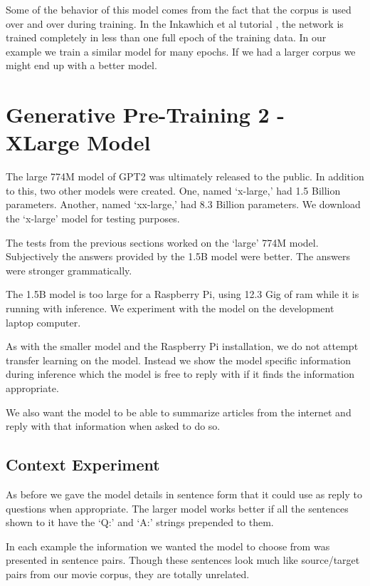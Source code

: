 Some of the behavior of this model comes from the fact that the corpus is used over and over during training. In the Inkawhich et al tutorial \cite{2018Inkawhich}, the network is trained completely in less than one full epoch of the training data. In our example we train a similar model for many epochs. If we had a larger corpus we might end up with a better model.



\section{Generative Pre-Training 2 - XLarge Model}

The large 774M model of GPT2 was ultimately released to the public. In addition to this, two other models were created. One, named `x-large,' had 1.5 Billion parameters. Another, named `xx-large,' had 8.3 Billion parameters. We download the `x-large' model for testing purposes.

The tests from the previous sections worked on the `large' 774M model. Subjectively the answers provided by the 1.5B model were better. The answers were stronger grammatically.

The 1.5B model is too large for a Raspberry Pi, using 12.3 Gig of ram while it is running with inference. We experiment with the model on the development laptop computer.

As with the smaller model and the Raspberry Pi installation, we do not attempt transfer learning on the model. Instead we show the model specific information during inference which the model is free to reply with if it finds the information appropriate.

We also want the model to be able to summarize articles from the internet and reply with that information when asked to do so. 

\label{chapter-gpt2-xl-intro}

\subsection{Context Experiment}

As before we gave the model details in sentence form that it could use as reply to questions when appropriate. The larger model works better if all the sentences shown to it have the `Q:' and `A:' strings prepended to them. 

In each example the information we wanted the model to choose from was presented in sentence pairs. Though these sentences look much like source/target pairs from our movie corpus, they are totally unrelated.

